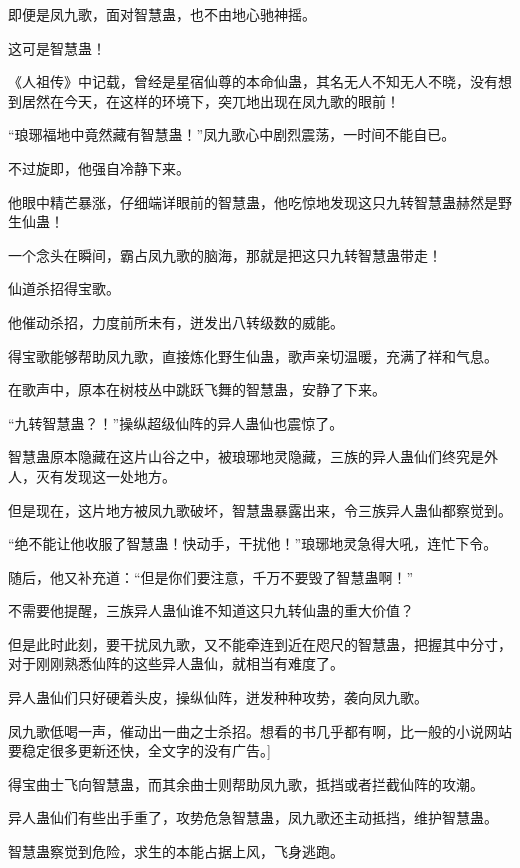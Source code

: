 
\begin{this_body}

即便是凤九歌，面对智慧蛊，也不由地心驰神摇。

这可是智慧蛊！

《人祖传》中记载，曾经是星宿仙尊的本命仙蛊，其名无人不知无人不晓，没有想到居然在今天，在这样的环境下，突兀地出现在凤九歌的眼前！

“琅琊福地中竟然藏有智慧蛊！”凤九歌心中剧烈震荡，一时间不能自已。

不过旋即，他强自冷静下来。

他眼中精芒暴涨，仔细端详眼前的智慧蛊，他吃惊地发现这只九转智慧蛊赫然是野生仙蛊！

一个念头在瞬间，霸占凤九歌的脑海，那就是把这只九转智慧蛊带走！

仙道杀招得宝歌。

他催动杀招，力度前所未有，迸发出八转级数的威能。

得宝歌能够帮助凤九歌，直接炼化野生仙蛊，歌声亲切温暖，充满了祥和气息。

在歌声中，原本在树枝丛中跳跃飞舞的智慧蛊，安静了下来。

“九转智慧蛊？！”操纵超级仙阵的异人蛊仙也震惊了。

智慧蛊原本隐藏在这片山谷之中，被琅琊地灵隐藏，三族的异人蛊仙们终究是外人，灭有发现这一处地方。

但是现在，这片地方被凤九歌破坏，智慧蛊暴露出来，令三族异人蛊仙都察觉到。

“绝不能让他收服了智慧蛊！快动手，干扰他！”琅琊地灵急得大吼，连忙下令。

随后，他又补充道：“但是你们要注意，千万不要毁了智慧蛊啊！”

不需要他提醒，三族异人蛊仙谁不知道这只九转仙蛊的重大价值？

但是此时此刻，要干扰凤九歌，又不能牵连到近在咫尺的智慧蛊，把握其中分寸，对于刚刚熟悉仙阵的这些异人蛊仙，就相当有难度了。

异人蛊仙们只好硬着头皮，操纵仙阵，迸发种种攻势，袭向凤九歌。

凤九歌低喝一声，催动出一曲之士杀招。想看的书几乎都有啊，比一般的小说网站要稳定很多更新还快，全文字的没有广告。]

得宝曲士飞向智慧蛊，而其余曲士则帮助凤九歌，抵挡或者拦截仙阵的攻潮。

异人蛊仙们有些出手重了，攻势危急智慧蛊，凤九歌还主动抵挡，维护智慧蛊。

智慧蛊察觉到危险，求生的本能占据上风，飞身逃跑。


\end{this_body}

